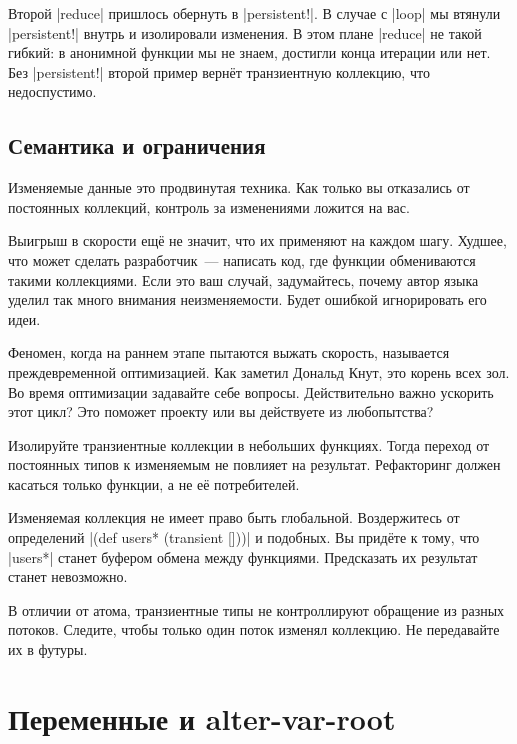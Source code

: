 Второй \spverb|reduce| пришлось обернуть в \spverb|persistent!|. В случае с
\spverb|loop| мы втянули \spverb|persistent!| внутрь и изолировали изменения. В
этом плане \spverb|reduce| не такой гибкий: в анонимной функции мы не знаем,
достигли конца итерации или нет. Без \spverb|persistent!| второй пример верн\"{е}т
транзиентную коллекцию, что недоспустимо.

\subsection{Семантика и ограничения}

Изменяемые данные это продвинутая техника. Как только вы отказались от
постоянных коллекций, контроль за изменениями ложится на вас.

Выигрыш в скорости ещ\"{е} не значит, что их применяют на каждом шагу. Худшее, что
может сделать разработчик~--- написать код, где функции обмениваются такими
коллекциями. Если это ваш случай, задумайтесь, почему автор языка уделил так
много внимания неизменяемости. Будет ошибкой игнорировать его идеи.


Феномен, когда на раннем этапе пытаются выжать скорость, называется
преждевременной оптимизацией. Как заметил Дональд Кнут, это корень всех зол. Во
время оптимизации задавайте себе вопросы. Действительно важно ускорить этот
цикл? Это поможет проекту или вы действуете из любопытства?

Изолируйте транзиентные коллекции в небольших функциях. Тогда переход от
постоянных типов к изменяемым не повлияет на результат. Рефакторинг должен
касаться только функции, а не е\"{е} потребителей.

Изменяемая коллекция не имеет право быть глобальной. Воздержитесь от определений
\spverb|(def users* (transient []))| и подобных. Вы прид\"{е}те к тому, что
\spverb|users*| станет буфером обмена между функциями. Предсказать их результат
станет невозможно.

В отличии от атома, транзиентные типы не контроллируют обращение из разных
потоков. Следите, чтобы только один поток изменял коллекцию. Не передавайте их в
футуры.

\section{Переменные и alter-var-root}


